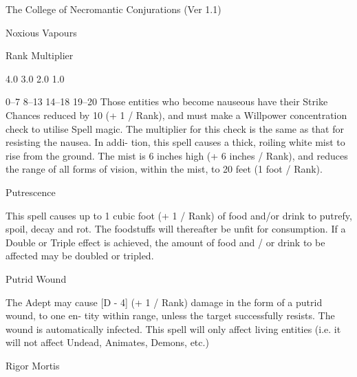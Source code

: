 \begin{Chapter}{The College of Necromantic Conjurations (Ver 1.1)}
\begin{spell}[G-6]{Noxious Vapours }
\begin{effects}
Rank  Multiplier 

4.0 
3.0 
2.0 
1.0 

0–7 
8–13 
14–18 
19–20 
Those  entities  who  become  nauseous  have  their 
Strike  Chances  reduced  by  10  (+  1  /  Rank),  and 
must  make  a  Willpower  concentration  check  to 
utilise Spell magic. The multiplier for this check is 
the  same  as  that  for  resisting  the  nausea.  In  addi-
tion, this spell causes a thick, roiling white mist to 
rise from the ground. The mist is 6 inches high (+ 6 
inches / Rank), and reduces the range of all forms 
of  vision,  within  the  mist,  to  20  feet  (1  foot  / 
Rank). 

\end{effects}
\end{spell}

\begin{spell}[G-7]{Putrescence }

\begin{effects}
This spell causes up to 1 cubic foot (+ 1 / 
Rank) of food and/or drink to putrefy, spoil, decay 
and  rot.  The  foodstuffs  will  thereafter  be  unfit  for 
consumption.  If  a  Double  or  Triple  effect  is 
achieved,  the  amount  of  food  and  /  or  drink  to  be 
affected may be doubled or tripled. 

\end{effects}
\end{spell}

\begin{spell}[G-8]{Putrid Wound }

\begin{effects}
The Adept may cause [D - 4] (+ 1 / Rank) 
damage  in  the  form of  a  putrid  wound,  to  one  en-
tity  within  range,  unless  the  target  successfully 
resists.  The  wound  is  automatically  infected.  This 
spell  will  only affect living entities (i.e. it will not 
affect Undead, Animates, Demons, etc.) 

\end{effects}
\end{spell}

\begin{spell}[G-9]{Rigor Mortis }


\end{spell}
\end{Chapter}
